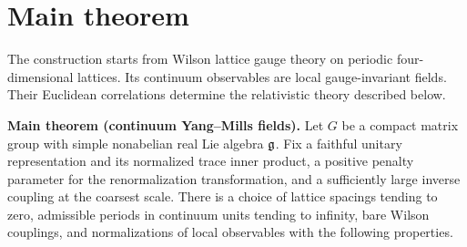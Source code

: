 \chapter*{Main theorem}

The construction starts from Wilson lattice gauge theory on periodic
four-dimensional lattices. Its continuum observables are local
gauge-invariant fields. Their Euclidean correlations determine the
relativistic theory described below.

\noindent\textbf{Main theorem (continuum Yang--Mills fields).}
Let $G$ be a compact matrix group with simple nonabelian real Lie algebra
$\mathfrak g$. Fix a faithful unitary representation and its normalized trace
inner product, a positive penalty parameter for the renormalization transformation,
and a sufficiently large inverse coupling at the coarsest scale.
There is a choice of lattice spacings tending to zero, admissible
periods in continuum units tending to infinity, bare Wilson couplings, and normalizations of
local observables with the following properties.

